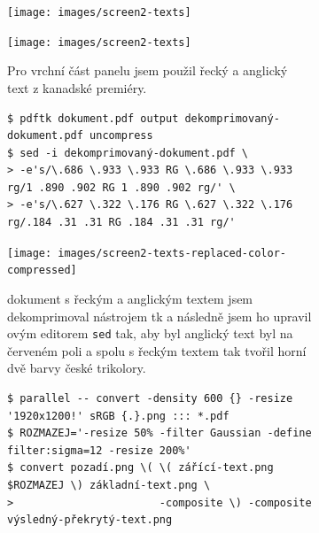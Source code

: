 \begin{figure}[p]
\begin{subfigure}{\linewidth}
\centering
\texttt{[image: images/screen2-texts]}
\par\vspace{3.5pt}
\texttt{[image: images/screen2-texts]}
\par\vspace{-1.5pt}
\caption{Pro vrchní část panelu jsem použil řecký a anglický text z kanadské premiéry.~\cite{morland2018fantasia}}
\label{fig:screen2-texts-greek-and-english-original}
\end{subfigure}
\par\vspace{10pt}
\begin{subfigure}{\linewidth}
\begingroup
\footnotesize
\begin{verbatim}
$ pdftk dokument.pdf output dekomprimovaný-dokument.pdf uncompress
$ sed -i dekomprimovaný-dokument.pdf \
> -e's/\.686 \.933 \.933 RG \.686 \.933 \.933 rg/1 .890 .902 RG 1 .890 .902 rg/' \
> -e's/\.627 \.322 \.176 RG \.627 \.322 \.176 rg/.184 .31 .31 RG .184 .31 .31 rg/'
\end{verbatim}
\endgroup
\par\vspace{1.5pt}
\centering
\texttt{[image: images/screen2-texts-replaced-color-compressed]}
\par\vspace{-1.5pt}
\caption{ dokument s řeckým a anglickým textem jsem dekomprimoval nástrojem \acro{PDF}tk a následně jsem ho upravil ovým editorem \texttt{sed} tak, aby byl anglický text byl na červeném poli a spolu s řeckým textem tak tvořil horní dvě barvy české trikolory.}
\label{fig:screen2-texts-greek-and-english-updated}
\end{subfigure}
\par\vspace{10pt}
\begin{subfigure}{\linewidth}
\begingroup
\footnotesize
\begin{verbatim}
$ parallel -- convert -density 600 {} -resize '1920x1200!' sRGB {.}.png ::: *.pdf
$ ROZMAZEJ='-resize 50% -filter Gaussian -define filter:sigma=12 -resize 200%'
$ convert pozadí.png \( \( zářící-text.png $ROZMAZEJ \) základní-text.png \
>                       -composite \) -composite výsledný-překrytý-text.png
\end{verbatim}
\endgroup
\par\vspace{1.5pt}

\end{subfigure}
\end{figure}
